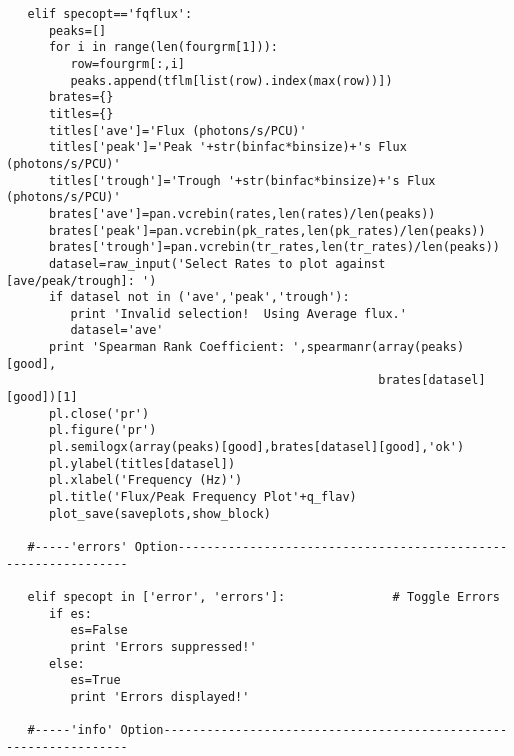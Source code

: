 \begin{verbatim}
   elif specopt=='fqflux':
      peaks=[]
      for i in range(len(fourgrm[1])):
         row=fourgrm[:,i]
         peaks.append(tflm[list(row).index(max(row))])
      brates={}
      titles={}
      titles['ave']='Flux (photons/s/PCU)'
      titles['peak']='Peak '+str(binfac*binsize)+'s Flux (photons/s/PCU)'
      titles['trough']='Trough '+str(binfac*binsize)+'s Flux (photons/s/PCU)'
      brates['ave']=pan.vcrebin(rates,len(rates)/len(peaks))
      brates['peak']=pan.vcrebin(pk_rates,len(pk_rates)/len(peaks))
      brates['trough']=pan.vcrebin(tr_rates,len(tr_rates)/len(peaks))
      datasel=raw_input('Select Rates to plot against [ave/peak/trough]: ')
      if datasel not in ('ave','peak','trough'):
         print 'Invalid selection!  Using Average flux.'
         datasel='ave'
      print 'Spearman Rank Coefficient: ',spearmanr(array(peaks)[good],
                                                    brates[datasel][good])[1]
      pl.close('pr')
      pl.figure('pr')
      pl.semilogx(array(peaks)[good],brates[datasel][good],'ok')
      pl.ylabel(titles[datasel])
      pl.xlabel('Frequency (Hz)')
      pl.title('Flux/Peak Frequency Plot'+q_flav)
      plot_save(saveplots,show_block)

   #-----'errors' Option---------------------------------------------------------------

   elif specopt in ['error', 'errors']:               # Toggle Errors
      if es:
         es=False
         print 'Errors suppressed!'
      else:
         es=True
         print 'Errors displayed!'

   #-----'info' Option-----------------------------------------------------------------


\end{verbatim}
